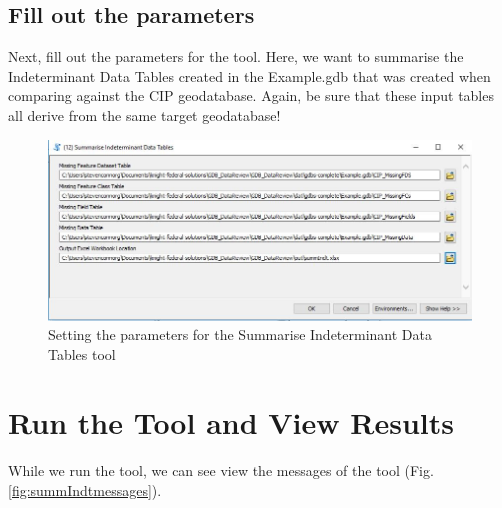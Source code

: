 \documentclass[openany]{book}
\theoremstyle{definition}
\theoremstyle{definition}
\theoremstyle{definition}
\theoremstyle{remark}
\begin{document}
\subsection{Fill out the parameters}\label{fill-out-the-parameters-9}

Next, fill out the parameters for the tool. Here, we want to summarise
the Indeterminant Data Tables created in the Example.gdb that was
created when comparing against the CIP geodatabase. Again, be sure that
these input tables all derive from the same target geodatabase!

\begin{figure}[H]

{\centering \includegraphics{figures/summIndt-toolparams} 

}

\caption{Setting the parameters for the Summarise Indeterminant Data Tables tool }\label{fig:summIndtparams}
\end{figure}

\section{Run the Tool and View
Results}\label{run-the-tool-and-view-results-9}

While we run the tool, we can see view the messages of the tool (Fig.
\ref{fig:summIndtmessages}).
\end{document}
